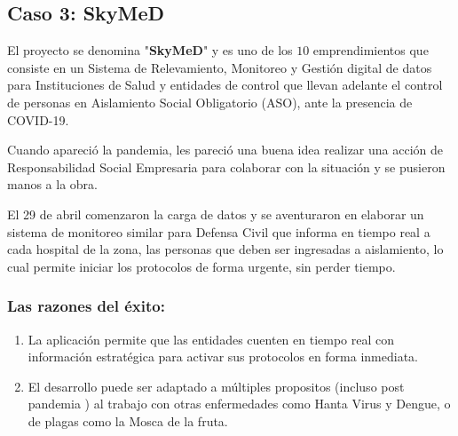 \documentclass[titlepage,a4paper,twoside]{article}
\theoremstyle{definition}
\numberwithin{algorithm}{section}
\theoremstyle{remark}
\numberwithin{equation}{section}
\begin{document}
    \subsection{Caso 3: SkyMeD}
    
    
    El proyecto se denomina "\textbf{SkyMeD}" y es uno de los $10$ emprendimientos que consiste en un Sistema de Relevamiento, Monitoreo y Gestión digital de datos para Instituciones de Salud y entidades de control que llevan adelante el control de personas en Aislamiento Social Obligatorio (ASO), ante la presencia de COVID-19.
    
    Cuando apareció la pandemia, les pareció una buena idea realizar una acción de Responsabilidad Social Empresaria para colaborar con la situación y se pusieron manos a la obra.
    
    El 29 de abril comenzaron la carga de datos y se aventuraron en elaborar un sistema de monitoreo similar para Defensa Civil que informa en tiempo real a cada hospital de la zona, las personas que deben ser ingresadas a aislamiento, lo cual permite iniciar los protocolos de forma urgente, sin perder tiempo.
    
    
    \subsubsection{Las razones del éxito:}
    
    
    \begin{enumerate}
    	\item La aplicación permite que las entidades cuenten en tiempo real con información estratégica para activar sus protocolos en forma inmediata.
    	
    	\item El desarrollo puede ser adaptado a múltiples propositos (incluso post pandemia ) al trabajo con otras enfermedades como Hanta Virus y Dengue, o de plagas como la Mosca de la fruta.
    \end{enumerate}
    
\end{document}
